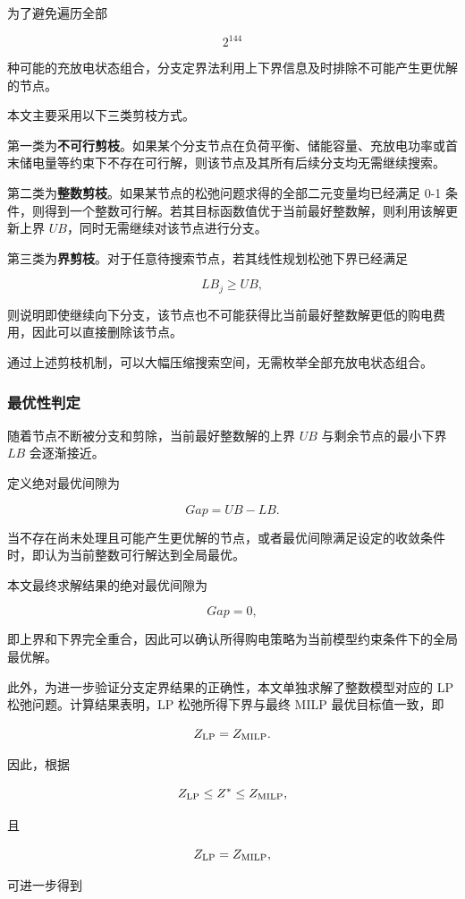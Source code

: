 为了避免遍历全部

\[
2^{144}
\]

种可能的充放电状态组合，分支定界法利用上下界信息及时排除不可能产生更优解的节点。

本文主要采用以下三类剪枝方式。

第一类为\textbf{不可行剪枝}。如果某个分支节点在负荷平衡、储能容量、充放电功率或首末储电量等约束下不存在可行解，则该节点及其所有后续分支均无需继续搜索。

第二类为\textbf{整数剪枝}。如果某节点的松弛问题求得的全部二元变量均已经满足 0-1 条件，则得到一个整数可行解。若其目标函数值优于当前最好整数解，则利用该解更新上界 \(UB\)，同时无需继续对该节点进行分支。

第三类为\textbf{界剪枝}。对于任意待搜索节点，若其线性规划松弛下界已经满足

\[
LB_j\geq UB,
\]

则说明即使继续向下分支，该节点也不可能获得比当前最好整数解更低的购电费用，因此可以直接删除该节点。

通过上述剪枝机制，可以大幅压缩搜索空间，无需枚举全部充放电状态组合。

\subsubsection{最优性判定}

随着节点不断被分支和剪除，当前最好整数解的上界 \(UB\) 与剩余节点的最小下界 \(LB\) 会逐渐接近。

定义绝对最优间隙为

\[
Gap=UB-LB.
\]

当不存在尚未处理且可能产生更优解的节点，或者最优间隙满足设定的收敛条件时，即认为当前整数可行解达到全局最优。

本文最终求解结果的绝对最优间隙为

\[
Gap=0,
\]

即上界和下界完全重合，因此可以确认所得购电策略为当前模型约束条件下的全局最优解。

此外，为进一步验证分支定界结果的正确性，本文单独求解了整数模型对应的 LP 松弛问题。计算结果表明，LP 松弛所得下界与最终 MILP 最优目标值一致，即

\[
Z_{\rm LP}=Z_{\rm MILP}.
\]

因此，根据

\[
Z_{\rm LP}\leq Z^*\leq Z_{\rm MILP},
\]

且

\[
Z_{\rm LP}=Z_{\rm MILP},
\]

可进一步得到

